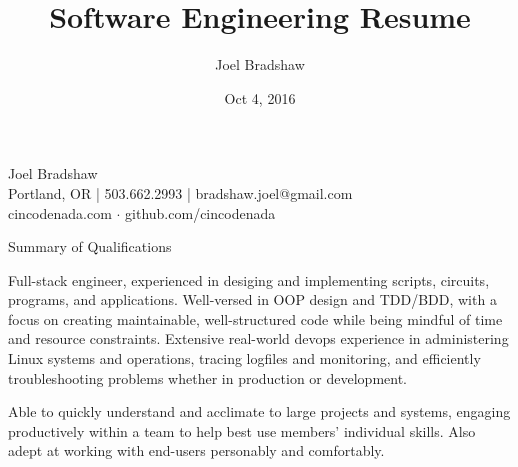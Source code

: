 \documentclass[letterpaper,10pt]{article}
\begin{document}
\sffamily
\title{Software Engineering Resume}
\author{Joel Bradshaw}
\date{Oct 4, 2016}
\begin{center}
{\Huge Joel Bradshaw}\\
\vskip 2pt
{\large
    Portland, OR | 503.662.2993 | bradshaw.joel@gmail.com\\
    cincodenada.com \ensuremath{\cdot} github.com/cincodenada}
\end{center}
\vskip -8pt

\rmfamily
\begin{res_section}{Summary of Qualifications}
  \rmfamily

  Full-stack engineer, experienced in desiging and implementing scripts, circuits, programs, and applications.
  Well-versed in OOP design and TDD/BDD, with a focus on creating maintainable, well-structured code while being mindful of time and resource constraints.
  Extensive real-world devops experience in administering Linux systems and operations, tracing logfiles and monitoring,
  and efficiently troubleshooting problems whether in production or development.

  \vskip 4pt Able to quickly understand and acclimate to large projects and systems, engaging productively within a team to help best use members' individual skills.
  Also adept at working with end-users personably and comfortably.


\end{res_section}
\end{document}

